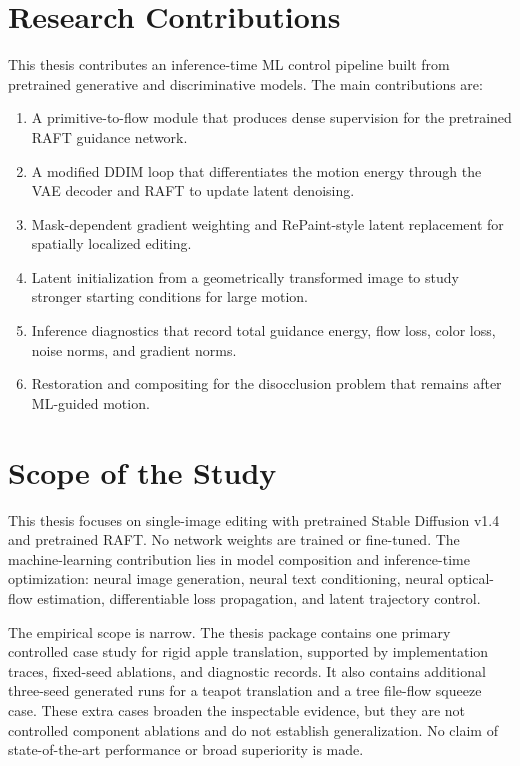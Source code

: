 \section{Research Contributions}

This thesis contributes an inference-time ML control pipeline built from pretrained generative and discriminative models. The main contributions are:

\begin{enumerate}
  \item A primitive-to-flow module that produces dense supervision for the pretrained RAFT guidance network.
  \item A modified DDIM loop that differentiates the motion energy through the VAE decoder and RAFT to update latent denoising.
  \item Mask-dependent gradient weighting and RePaint-style latent replacement for spatially localized editing.
  \item Latent initialization from a geometrically transformed image to study stronger starting conditions for large motion.
  \item Inference diagnostics that record total guidance energy, flow loss, color loss, noise norms, and gradient norms.
  \item Restoration and compositing for the disocclusion problem that remains after ML-guided motion.
\end{enumerate}

\section{Scope of the Study}

This thesis focuses on single-image editing with pretrained Stable Diffusion v1.4 and pretrained RAFT. No network weights are trained or fine-tuned. The machine-learning contribution lies in model composition and inference-time optimization: neural image generation, neural text conditioning, neural optical-flow estimation, differentiable loss propagation, and latent trajectory control.

The empirical scope is narrow. The thesis package contains one primary controlled case study for rigid apple translation, supported by implementation traces, fixed-seed ablations, and diagnostic records. It also contains additional three-seed generated runs for a teapot translation and a tree file-flow squeeze case. These extra cases broaden the inspectable evidence, but they are not controlled component ablations and do not establish generalization. No claim of state-of-the-art performance or broad superiority is made.

